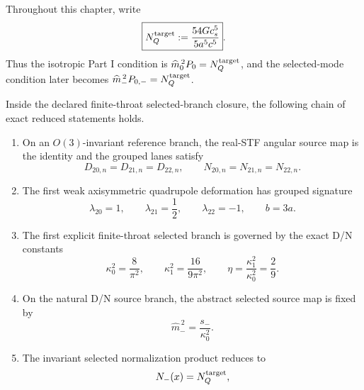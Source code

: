 \begin{definition}
\label{def:part02-NQ-target}
Throughout this chapter, write
\begin{equation}
\label{eq:part02-NQ-target}
\boxed{
N_Q^{\rm target}
:=
\frac{54G c_s^5}{5a^5c^5}}.
\end{equation}
Thus the isotropic Part I condition is \(\widehat m_0^{\,2}P_0=N_Q^{\rm target}\), and the selected-mode condition later becomes \(\widehat m_-^{\,2}P_{0,-}=N_Q^{\rm target}\).
\end{definition}

\begin{theorem}
\label{thm:part02-placement-theorem}
Inside the declared finite-throat selected-branch closure, the following chain of exact reduced statements holds.
\begin{enumerate}[leftmargin=2.2em]
  \item On an \(O(3)\)-invariant reference branch, the real-STF angular source map is the identity and the grouped lanes satisfy
  \begin{equation}
  D_{20,n}=D_{21,n}=D_{22,n},
  \qquad
  N_{20,n}=N_{21,n}=N_{22,n}.
  \end{equation}
  \item The first weak axisymmetric quadrupole deformation has grouped signature
  \begin{equation}
  \lambda_{20}=1,
  \qquad
  \lambda_{21}=\frac12,
  \qquad
  \lambda_{22}=-1,
  \qquad
  b=3a.
  \end{equation}
  \item The first explicit finite-throat selected branch is governed by the exact D/N constants
  \begin{equation}
  \kappa_0^2=\frac{8}{\pi^2},
  \qquad
  \kappa_1^2=\frac{16}{9\pi^2},
  \qquad
  \eta=\frac{\kappa_1^2}{\kappa_0^2}=\frac29.
  \end{equation}
  \item On the natural D/N source branch, the abstract selected source map is fixed by
  \begin{equation}
  \widehat m_-^{\,2}=\frac{s_-}{\kappa_0^2}.
  \end{equation}
  \item The invariant selected normalization product reduces to
  \begin{equation}
  \label{eq:part02-theorem-Nminus}
  N_-(x)=N_Q^{\rm target},
  \end{equation}

\end{enumerate}
\end{theorem}
